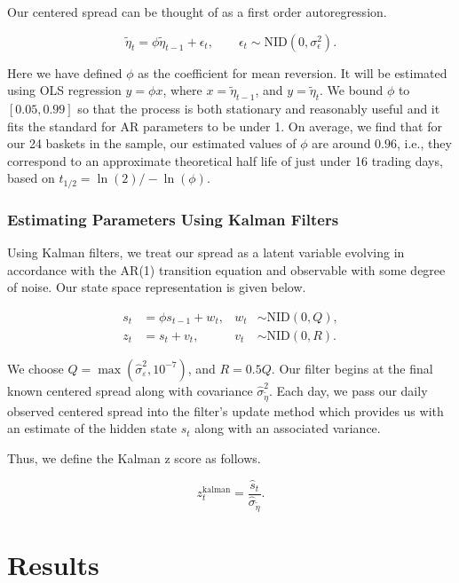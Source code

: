 \documentclass[12pt]{article}
\begin{document}
Our centered spread can be thought of as a first order autoregression.

\begin{equation}
\tilde{\eta}_t = \phi \tilde{\eta}_{t-1} + \epsilon_t,
\qquad \epsilon_t \sim \text{NID}(0, \sigma^2_\epsilon).
\end{equation}

Here we have defined $\phi$ as the coefficient for mean reversion. It will be estimated using OLS regression $y = \phi x$, where $x = \tilde{\eta}_{t-1}$, and $y = \tilde{\eta}_t$. We bound $\phi$ to $[0.05, 0.99]$ so that the process is both stationary and reasonably useful and it fits the standard for AR parameters to be under 1. On average, we find that for our 24 baskets in the sample, our estimated values of $\phi$ are around $0.96$, i.e., they correspond to an approximate theoretical half life of just under 16 trading days, based on $t_{1/2} = \ln(2) / -\ln(\phi)$.

\subsubsection{Estimating Parameters Using Kalman Filters}

Using Kalman filters, we treat our spread as a latent variable evolving in accordance with the AR(1) transition equation and observable with some degree of noise. Our state space representation is given below.

\begin{align}
s_t &= \phi s_{t-1} + w_t,
& w_t &\sim \text{NID}(0,Q), \\
z_t &= s_t + v_t,
& v_t &\sim \text{NID}(0,R).
\end{align}

We choose $Q = \max(\hat{\sigma}^2_\varepsilon, 10^{-7})$, and $R = 0.5Q$. Our filter begins at the final known centered spread along with covariance $\hat{\sigma}^2_{\tilde{\eta}}$. Each day, we pass our daily observed centered spread into the filter's update method which provides us with an estimate of the hidden state $s_t$ along with an associated variance.

Thus, we define the Kalman z score as follows.

\begin{equation}
z_t^{\text{kalman}} = \frac{\hat{s}_t}{\hat{\sigma}_{\tilde{\eta}}}.
\end{equation}

\section{Results}
\end{document}
